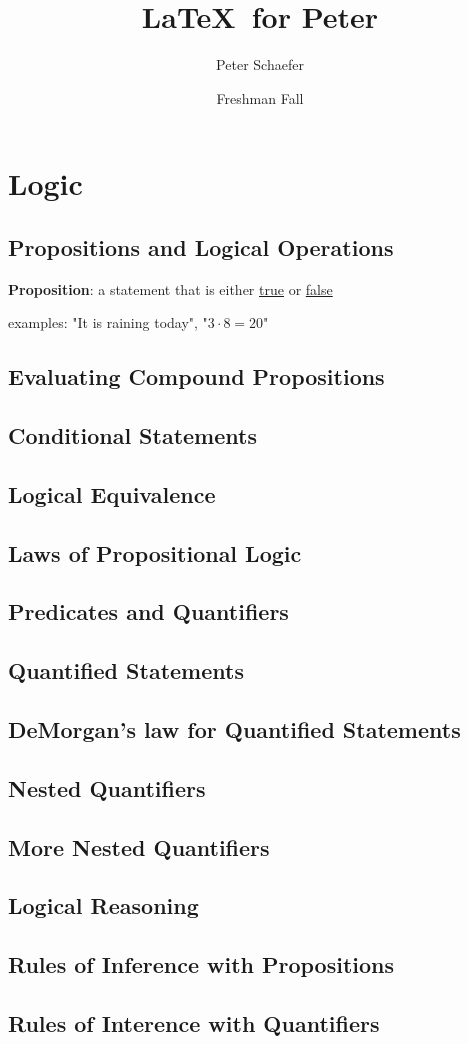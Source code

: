 \documentclass{article}
\title{\LaTeX\ for Peter}
\author{Peter Schaefer}
\date{Freshman Fall}
\begin{document}
\maketitle

\tableofcontents

\newpage

\section{Logic}
\subsection{Propositions and Logical Operations}

\textbf{Proposition}: a statement that is either \underline{true} or \underline{false}

examples: "It is raining today",  "\(3 \cdot 8 = 20 \)"

\subsection{Evaluating Compound Propositions}
\subsection{Conditional Statements}
\subsection{Logical Equivalence}
\subsection{Laws of Propositional Logic}
\subsection{Predicates and Quantifiers}
\subsection{Quantified Statements}
\subsection{DeMorgan's law for Quantified Statements}
\subsection{Nested Quantifiers}
\subsection{More Nested Quantifiers}
\subsection{Logical Reasoning}
\subsection{Rules of Inference with Propositions}
\subsection{Rules of Interence with Quantifiers}
\end{document}
